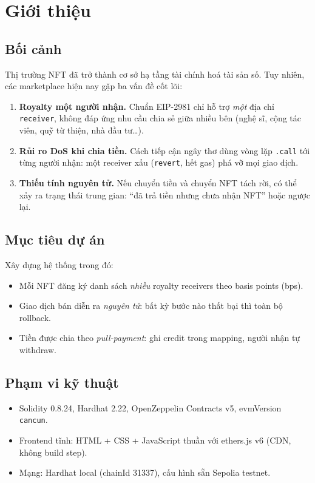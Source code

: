 \documentclass[12pt,a4paper,oneside]{report}
\theoremstyle{plain}
\theoremstyle{definition}
\theoremstyle{remark}
\begin{document}
\chapter{Giới thiệu}
\label{chap:intro}

\section{Bối cảnh}
Thị trường NFT đã trở thành cơ sở hạ tầng tài chính hoá tài sản số. Tuy nhiên, các marketplace
hiện nay gặp ba vấn đề cốt lõi:
\begin{enumerate}
  \item \textbf{Royalty một người nhận.} Chuẩn EIP-2981 chỉ hỗ trợ \emph{một} địa chỉ
        \texttt{receiver}, không đáp ứng nhu cầu chia sẻ giữa nhiều bên (nghệ sĩ, cộng tác viên,
        quỹ từ thiện, nhà đầu tư\ldots).
  \item \textbf{Rủi ro DoS khi chia tiền.} Cách tiếp cận ngây thơ dùng vòng lặp \texttt{.call}
        tới từng người nhận: một receiver xấu (\texttt{revert}, hết gas) phá vỡ mọi giao dịch.
  \item \textbf{Thiếu tính nguyên tử.} Nếu chuyển tiền và chuyển NFT tách rời, có thể xảy ra
        trạng thái trung gian: ``đã trả tiền nhưng chưa nhận NFT'' hoặc ngược lại.
\end{enumerate}

\section{Mục tiêu dự án}
Xây dựng hệ thống trong đó:
\begin{itemize}
  \item Mỗi NFT đăng ký danh sách \emph{nhiều} royalty receivers theo basis points (bps).
  \item Giao dịch bán diễn ra \emph{nguyên tử}: bất kỳ bước nào thất bại thì toàn bộ rollback.
  \item Tiền được chia theo \emph{pull-payment}: ghi credit trong mapping, người nhận tự withdraw.
\end{itemize}

\section{Phạm vi kỹ thuật}
\begin{itemize}
  \item Solidity 0.8.24, Hardhat 2.22, OpenZeppelin Contracts v5, evmVersion \texttt{cancun}.
  \item Frontend tĩnh: HTML + CSS + JavaScript thuần với ethers.js v6 (CDN, không build step).
  \item Mạng: Hardhat local (chainId 31337), cấu hình sẵn Sepolia testnet.
\end{itemize}
\end{document}
